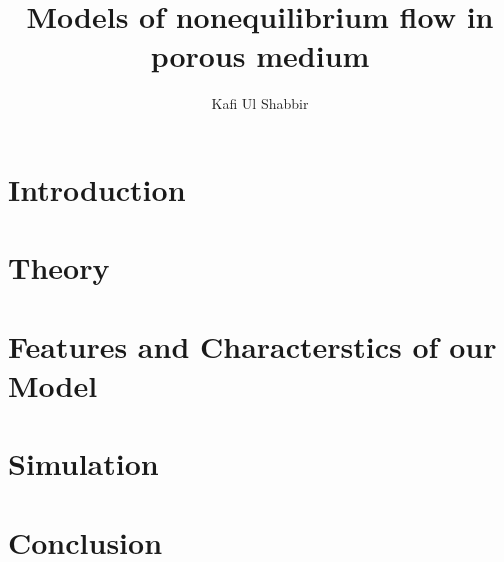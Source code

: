 \documentclass[
	12pt
] {article}
\title{Models of nonequilibrium flow in porous medium}
\author{Kafi Ul Shabbir}
\begin{document}
	\nocite{*}
	\maketitle
	
	
		\newpage
		
	\tableofcontents
		\newpage
		
	\begin{abstract}
		
	\end{abstract}
		
	\section{Introduction}
		
		
	\section{Theory}
		
		
	\section{Features and Characterstics of our Model}
		

	\section{Simulation}
		

	\section{Conclusion}
		
		
	
	
		
\end{document}
